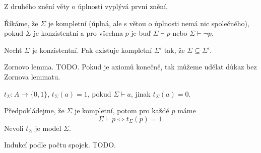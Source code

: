 \documentclass[12pt]{article}                   %
\begin{document}
    \begin{dusledek}
        Z druhého znění věty o úplnosti vyplývá první znění.
    \end{dusledek}

    \begin{definice}
        Říkáme, že $\Sigma$ je kompletní (úplná, ale s větou o úplnosti nemá nic společného), pokud $\Sigma$ je konzistentní a pro všechna $p$ je buď $\Sigma \vdash p$ nebo $\Sigma \vdash \neg p$.
    \end{definice}

    \begin{lemma}[Lindenbaum]
        Nechť $\Sigma$ je konzistentní. Pak existuje kompletní $\Sigma'$ tak, že $\Sigma \subseteq \Sigma'$.

        \begin{dukazin}
            Zornovo lemma. TODO. Pokud je axiomů konečně, tak můžeme udělat důkaz bez Zornova lemmatu.
        \end{dukazin}
    \end{lemma}

    \begin{definice}
        $t_\Sigma: A \rightarrow \{0, 1\}$, $t_\Sigma(a) = 1$, pokud $\Sigma \vdash a$, jinak $t_\Sigma(a)= 0$.
    \end{definice}

    \begin{lemma}
        Předpokládejme, že $\Sigma$ je kompletní, potom pro každé $p$ máme
        $$ \Sigma \vdash p \Leftrightarrow t_\Sigma(p) = 1. $$
        Nevoli $t_\Sigma$ je model $\Sigma$.

        \begin{dukazin}
            Indukcí podle počtu spojek. TODO.
        \end{dukazin}
    \end{lemma}
\end{document}
